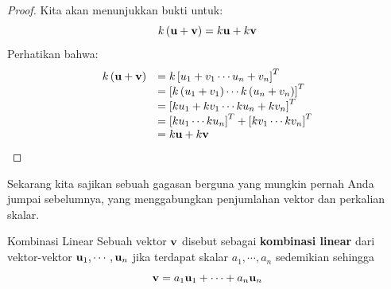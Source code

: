 \ifdefined\showproofs
\begin{proof}
Kita akan menunjukkan bukti untuk:
\begin{equation*}
k \left( \mathbf{u}+\mathbf{v}\right) = k \mathbf{u}+ k \mathbf{v}
\end{equation*}
Perhatikan bahwa:
\begin{equation*}
\begin{array}{ll}
k \left( \mathbf{u}+\mathbf{v}\right) & =k \left[ u_{1}+v_{1} \cdots u_{n}+v_{n}\right]^T \\
& = \left[ k \left( u_{1}+v_{1}\right) \cdots k \left( u_{n}+v_{n}\right) \right]^T \\
& = \left[ k u_{1}+ k  v_{1} \cdots k u_{n}+ k v_{n}\right]^T \\
& = \left[ k u_{1} \cdots k u_{n} \right]^T + \left[ k v_{1} \cdots k v_{n} \right]^T \\
& = k \mathbf{u}+k \mathbf{v} \\
\end{array}
\end{equation*}
\end{proof}
\fi
Sekarang kita sajikan sebuah gagasan berguna yang mungkin pernah Anda jumpai sebelumnya, yang menggabungkan penjumlahan vektor dan perkalian skalar.

\begin{definition}{Kombinasi Linear}\label{def:linearcombination}
Sebuah vektor $\mathbf{v}$ disebut sebagai \textbf{kombinasi linear}
 dari vektor-vektor $\mathbf{u}_1,\cdots , \mathbf{u}_n $
jika terdapat skalar $a_{1},\cdots ,a_{n}$ sedemikian sehingga
\begin{equation*}
\mathbf{v} = a_1 \mathbf{u}_1 + \cdots + a_n \mathbf{u}_n
\end{equation*}
\end{definition}


